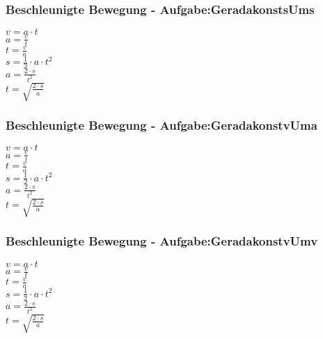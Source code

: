 \subsubsection{Beschleunigte Bewegung - Aufgabe:GeradakonstsUms} 
\begin{minipage}{0.45\textwidth} 
$ v = a\cdot t $\\ 
$ a = \frac{v}{t} $\\ 
$ t = \frac{v}{a} $\\ 
$ s = \frac{1}{2}\cdot a\cdot t^{2} $\\ 
$ a = \frac{2\cdot s}{t^{2} } $\\ 
$ t = \sqrt{\frac{2\cdot s}{a}} $\\ 
\end{minipage} 
\begin{minipage}{0.45\textwidth} 
 
\end{minipage} 
\subsubsection{Beschleunigte Bewegung - Aufgabe:GeradakonstvUma} 
\begin{minipage}{0.45\textwidth} 
$ v = a\cdot t $\\ 
$ a = \frac{v}{t} $\\ 
$ t = \frac{v}{a} $\\ 
$ s = \frac{1}{2}\cdot a\cdot t^{2} $\\ 
$ a = \frac{2\cdot s}{t^{2} } $\\ 
$ t = \sqrt{\frac{2\cdot s}{a}} $\\ 
\end{minipage} 
\begin{minipage}{0.45\textwidth} 
 
\end{minipage} 
\subsubsection{Beschleunigte Bewegung - Aufgabe:GeradakonstvUmv} 
\begin{minipage}{0.45\textwidth} 
$ v = a\cdot t $\\ 
$ a = \frac{v}{t} $\\ 
$ t = \frac{v}{a} $\\ 
$ s = \frac{1}{2}\cdot a\cdot t^{2} $\\ 
$ a = \frac{2\cdot s}{t^{2} } $\\ 
$ t = \sqrt{\frac{2\cdot s}{a}} $\\ 
\end{minipage} 
\begin{minipage}{0.45\textwidth} 
 
\end{minipage} 
